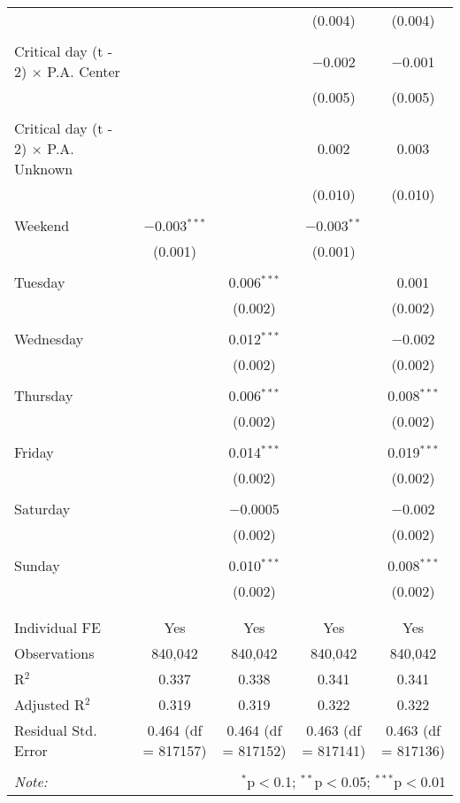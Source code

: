 \documentclass[
]{article}
\begin{document}
\begin{table}[!htbp]
{\begin{tabular}{@{\extracolsep{5pt}}lcccc}
  &  &  & (0.004) & (0.004) \\ 
  & & & & \\ 
 Critical day (t - 2) $\times$ P.A. Center &  &  & $-$0.002 & $-$0.001 \\ 
  &  &  & (0.005) & (0.005) \\ 
  & & & & \\ 
 Critical day (t - 2) $\times$ P.A. Unknown &  &  & 0.002 & 0.003 \\ 
  &  &  & (0.010) & (0.010) \\ 
  & & & & \\ 
 Weekend & $-$0.003$^{***}$ &  & $-$0.003$^{**}$ &  \\ 
  & (0.001) &  & (0.001) &  \\ 
  & & & & \\ 
 Tuesday &  & 0.006$^{***}$ &  & 0.001 \\ 
  &  & (0.002) &  & (0.002) \\ 
  & & & & \\ 
 Wednesday &  & 0.012$^{***}$ &  & $-$0.002 \\ 
  &  & (0.002) &  & (0.002) \\ 
  & & & & \\ 
 Thursday &  & 0.006$^{***}$ &  & 0.008$^{***}$ \\ 
  &  & (0.002) &  & (0.002) \\ 
  & & & & \\ 
 Friday &  & 0.014$^{***}$ &  & 0.019$^{***}$ \\ 
  &  & (0.002) &  & (0.002) \\ 
  & & & & \\ 
 Saturday &  & $-$0.0005 &  & $-$0.002 \\ 
  &  & (0.002) &  & (0.002) \\ 
  & & & & \\ 
 Sunday &  & 0.010$^{***}$ &  & 0.008$^{***}$ \\ 
  &  & (0.002) &  & (0.002) \\ 
  & & & & \\ 
\hline \\[-1.8ex] 
Individual FE & Yes & Yes & Yes & Yes \\ 
Observations & 840,042 & 840,042 & 840,042 & 840,042 \\ 
R$^{2}$ & 0.337 & 0.338 & 0.341 & 0.341 \\ 
Adjusted R$^{2}$ & 0.319 & 0.319 & 0.322 & 0.322 \\ 
Residual Std. Error & 0.464 (df = 817157) & 0.464 (df = 817152) & 0.463 (df = 817141) & 0.463 (df = 817136) \\ 
\hline 
\hline \\[-1.8ex] 
\textit{Note:}  & \multicolumn{4}{r}{$^{*}$p$<$0.1; $^{**}$p$<$0.05; $^{***}$p$<$0.01} \\ 
\end{tabular}
} 
\end{table} 
\newpage
\end{document}
